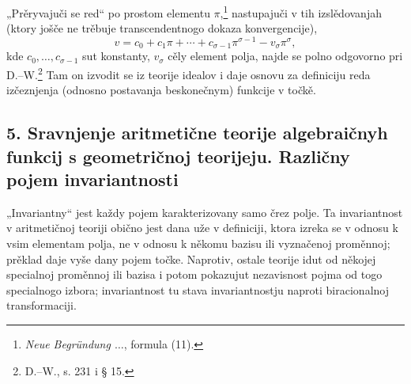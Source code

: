 \documentclass[11pt]{article}
\begin{document}
„Prěryvajuči se red“ po prostom elementu \(\pi\),\footnote{\emph{Neue Begründung \(\ldots\)}, formula (11).} nastupajuči v tih izslědovanjah (ktory jošče ne trěbuje transcendentnogo dokaza konvergencije),
\[
v=c_0+c_1\pi+\cdots+c_{\sigma-1}\pi^{\sigma-1}-v_\sigma\pi^\sigma,
\]
kde \(c_0,\ldots,c_{\sigma-1}\) sut konstanty, \(v_\sigma\) cěly element polja, najde se polno odgovorno pri D.--W.\footnote{D.--W., s. 231 i § 15.} Tam on izvodit se iz teorije idealov i daje osnovu za definiciju reda izčeznjenja (odnosno postavanja beskonečnym) funkcije v točkě.

\subsection*{5. Sravnjenje aritmetične teorije algebraičnyh funkcij s geometričnoj teorijeju. Različny pojem invariantnosti}
„Invariantny“ jest každy pojem karakterizovany samo črez polje. Ta invariantnost v aritmetičnoj teoriji obično jest dana uže v definiciji, ktora izreka se v odnosu k vsim elementam polja, ne v odnosu k někomu bazisu ili vyznačenoj proměnnoj; prěklad daje vyše dany pojem točke. Naprotiv, ostale teorije idut od někojej specialnoj proměnnoj ili bazisa i potom pokazujut nezavisnost pojma od togo specialnogo izbora; invariantnost tu stava invariantnostju naproti biracionalnoj transformaciji.
\end{document}
